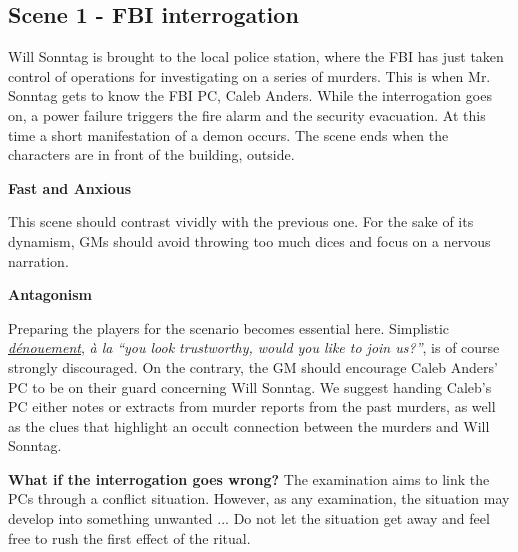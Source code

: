 \subsection{Scene 1 - FBI interrogation}

\begin{scene_summary}
Will Sonntag is brought to the local police station, where the FBI has just
taken control of operations for investigating on a series of murders. This is
when Mr. Sonntag gets to know the FBI PC, Caleb Anders. While the interrogation goes on, a power failure triggers the fire alarm and the security evacuation. At this time a short manifestation of a demon occurs. The scene ends when the characters are in front of the building, outside.
\end{scene_summary}

\begin{leading_idea}
{\bf Fast and Anxious}

This scene should contrast vividly with the previous one. For the sake of its
dynamism, GMs should avoid throwing too much dices and focus on a nervous
narration.

{\bf Antagonism}

Preparing the players for the scenario becomes essential here. Simplistic
\href{http://deadgentlemen.com/projects/the-gamers/the-gamers/}{\textit{d\'enouement}},
\textit{\`a la} \textit{``you look trustworthy, would you like to join us?''},
is of course strongly discouraged. On the contrary, the GM should encourage
Caleb Anders' PC to be on their guard concerning Will Sonntag.  We suggest
handing Caleb's PC either notes or extracts from murder reports from the past
murders, as well as the clues that highlight an occult connection between the
murders and Will Sonntag.
\end{leading_idea}

\begin{sidenote}
{\bf What if the interrogation goes wrong?}
The examination aims to link the PCs through a conflict situation. However, as
any examination, the situation may develop into something unwanted ... Do not
let the situation get away and feel free to rush the first effect of
the ritual.
\end{sidenote}

